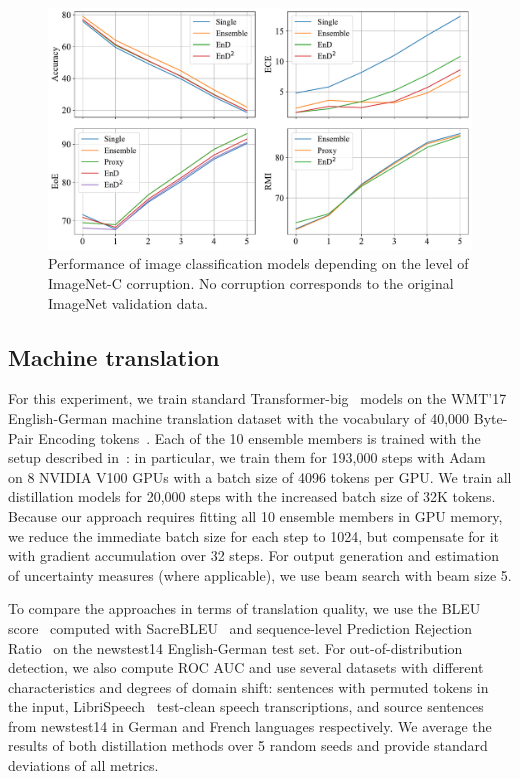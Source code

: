 \begin{figure}
    \centering
    \includegraphics[width=\textwidth]{figures/breakdown.pdf}
    \caption{Performance of image classification models depending on the level of ImageNet-C corruption.  No corruption corresponds to the original ImageNet validation data.}
    \label{fig:imagenet_breakdown}
\end{figure}

\subsection{Machine translation}
\label{experiments:nmt}
For this experiment, we train standard Transformer-big~\cite{vaswani2017attention} models on the WMT'17 English-German machine translation dataset with the vocabulary of 40,000 Byte-Pair Encoding tokens~\cite{sennrich-etal-2016-neural}. Each of the 10 ensemble members is trained with the setup described in~\cite{ott2018scaling}: in particular, we train them for 193,000 steps with Adam~\cite{adam} on 8 NVIDIA V100 GPUs with a batch size of 4096 tokens per GPU. We train all distillation models for 20,000 steps with the increased batch size of 32K tokens. Because our approach requires fitting all 10 ensemble members in GPU memory, we reduce the immediate batch size for each step to 1024, but compensate for it with gradient accumulation over 32 steps. For output generation and estimation of uncertainty measures (where applicable), we use beam search with beam size 5.

To compare the approaches in terms of translation quality, we use the BLEU score~\cite{papineni2002bleu} computed with SacreBLEU~\cite{sacrebleu} and sequence-level Prediction Rejection Ratio~\cite{malinin-thesis} on the newstest14 English-German test set. For out-of-distribution detection, we also compute ROC AUC and use several datasets with different characteristics and degrees of domain shift: sentences with permuted tokens in the input, LibriSpeech~\cite{librispeech} test-clean speech transcriptions, and source sentences from newstest14 in German and French languages respectively. We average the results of both distillation methods over 5 random seeds and provide standard deviations of all metrics.

